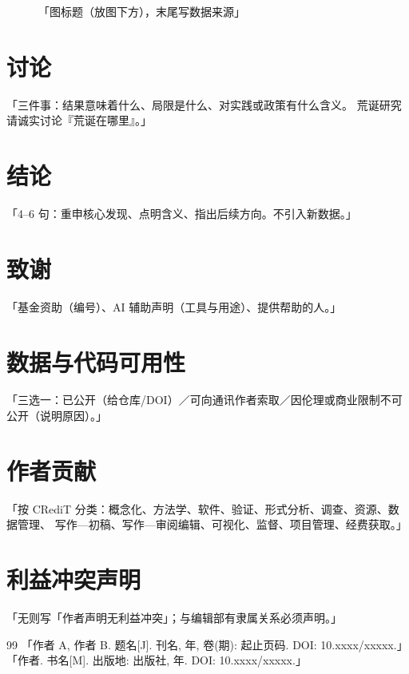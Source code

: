 \documentclass[12pt,a4paper]{article}
\begin{document}
\begin{figure}[htbp]
\centering
\caption{「图标题（放图下方），末尾写数据来源」}
\label{fig:demo}
\end{figure}

\section{讨论}
「三件事：结果意味着什么、局限是什么、对实践或政策有什么含义。
荒诞研究请诚实讨论『荒诞在哪里』。」

\section{结论}
「4--6 句：重申核心发现、点明含义、指出后续方向。不引入新数据。」

\section*{致谢}
「基金资助（编号）、AI 辅助声明（工具与用途）、提供帮助的人。」

\section*{数据与代码可用性}
「三选一：已公开（给仓库/DOI）／可向通讯作者索取／因伦理或商业限制不可公开（说明原因）。」

\section*{作者贡献}
「按 CRediT 分类：概念化、方法学、软件、验证、形式分析、调查、资源、数据管理、
写作—初稿、写作—审阅编辑、可视化、监督、项目管理、经费获取。」

\section*{利益冲突声明}
「无则写「作者声明无利益冲突」；与编辑部有隶属关系必须声明。」

\begin{thebibliography}{99}
 「作者 A, 作者 B. 题名[J]. 刊名, 年, 卷(期): 起止页码. DOI: 10.xxxx/xxxxx.」
 「作者. 书名[M]. 出版地: 出版社, 年. DOI: 10.xxxx/xxxxx.」
\end{thebibliography}
\end{document}
